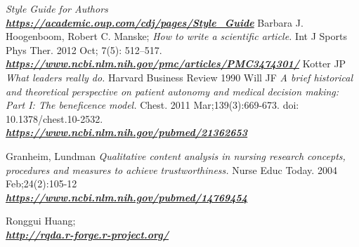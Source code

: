 \documentclass[12pt,a4paper,oneside]{article}
\begin{document}
\begin{thebibliography}{11}
\emph{Style Guide for Authors} \\\textbf{\emph{\href{https://academic.oup.com/cdj/pages/Style_Guide}{\url{https://academic.oup.com/cdj/pages/Style_Guide}}}}
Barbara J. Hoogenboom, Robert C. Manske; \emph{How to write a scientific article.} Int J Sports Phys Ther. 2012 Oct; 7(5): 512--517. \\\textbf{\emph{\href{https://www.ncbi.nlm.nih.gov/pmc/articles/PMC3474301/}{\url{https://www.ncbi.nlm.nih.gov/pmc/articles/PMC3474301/}}}}
Kotter JP \emph{What leaders really do.} Harvard Business Review 1990
Will JF \emph{A brief historical and theoretical perspective on patient autonomy and medical decision making: Part I: The beneficence model.} Chest. 2011 Mar;139(3):669-673. doi: 10.1378/chest.10-2532. \\\textbf{\emph{\href{https://www.ncbi.nlm.nih.gov/pubmed/21362653}{\url{https://www.ncbi.nlm.nih.gov/pubmed/21362653}}}}

Granheim, Lundman \emph{Qualitative content analysis in nursing research concepts, procedures and measures to achieve trustworthiness.} Nurse Educ Today. 2004 Feb;24(2):105-12 \\\textbf{\emph{\href{https://www.ncbi.nlm.nih.gov/pubmed/14769454}{\url{https://www.ncbi.nlm.nih.gov/pubmed/14769454}}}}


Ronggui Huang; \\\textbf{\emph{\href{http://rqda.r-forge.r-project.org/}{\url{http://rqda.r-forge.r-project.org/}}}}

\end{thebibliography} 
 
\end{document}
